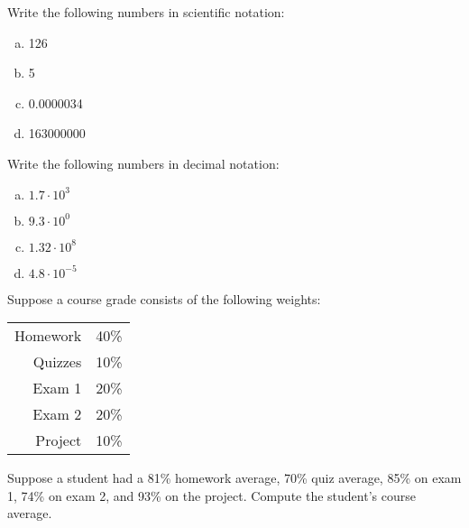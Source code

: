 \documentclass[11pt,letterpaper]{article}
\begin{document}

 Write the following numbers in scientific notation:
	\begin{enumerate}[(a)]
	\item 126
	\item 5
	\item 0.0000034
	\item 163000000
	\end{enumerate}



\newpage



 Write the following numbers in decimal notation:
	\begin{enumerate}[(a)]
	\item $1.7 \cdot 10^3$
	\item $9.3 \cdot 10^0$
	\item $1.32 \cdot 10^8$
	\item $4.8 \cdot 10^{-5}$
	\end{enumerate}



\newpage



 Suppose a course grade consists of the following weights:
	\begin{table}[!ht]
	\centering
	\begin{tabular}{rl}
	Homework & 40\% \\
	Quizzes & 10\% \\
	Exam 1 & 20\% \\
	Exam 2 & 20\% \\
	Project & 10\%
	\end{tabular}
	\end{table} \par
Suppose a student had a 81\% homework average, 70\% quiz average, 85\% on exam 1, 74\% on exam 2, and 93\% on the project. Compute the student's course average.



\newpage
\end{document}
